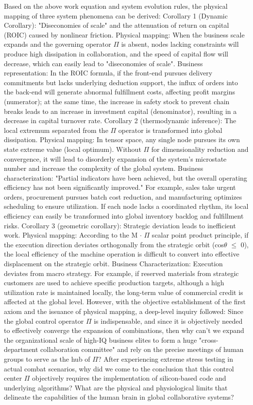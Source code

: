 \documentclass[11pt,a4paper]{article}
\begin{document}
Based on the above work equation and system evolution rules, the physical mapping of three system phenomena can be derived: Corollary 1 (Dynamic Corollary): "Diseconomies of scale" and the attenuation of return on capital (ROIC) caused by nonlinear friction. Physical mapping: When the business scale expands and the governing operator $\Pi$ is absent, nodes lacking constraints will produce high dissipation in collaboration, and the speed of capital flow will decrease, which can easily lead to "diseconomies of scale". Business representation: In the ROIC formula, if the front-end pursues delivery commitments but lacks underlying deduction support, the influx of orders into the back-end will generate abnormal fulfillment costs, affecting profit margins (numerator); at the same time, the increase in safety stock to prevent chain breaks leads to an increase in investment capital (denominator), resulting in a decrease in capital turnover rate. Corollary 2 (thermodynamic inference): The local extremum separated from the $\Pi$ operator is transformed into global dissipation. Physical mapping: In tensor space, any single node pursues its own state extreme value (local optimum). Without $\Pi$ for dimensionality reduction and convergence, it will lead to disorderly expansion of the system's microstate number and increase the complexity of the global system. Business characterization: "Partial indicators have been achieved, but the overall operating efficiency has not been significantly improved." For example, sales take urgent orders, procurement pursues batch cost reduction, and manufacturing optimizes scheduling to ensure utilization. If each node lacks a coordinated rhythm, its local efficiency can easily be transformed into global inventory backlog and fulfillment risks. Corollary 3 (geometric corollary): Strategic deviation leads to inefficient work. Physical mapping: According to the M $\cdot$ $\Pi$ scalar point product principle, if the execution direction deviates orthogonally from the strategic orbit (cos$\theta$ $\le$ 0), the local efficiency of the machine operation is difficult to convert into effective displacement on the strategic orbit. Business Characterization: Execution deviates from macro strategy. For example, if reserved materials from strategic customers are used to achieve specific production targets, although a high utilization rate is maintained locally, the long-term value of commercial credit is affected at the global level. However, with the objective establishment of the first axiom and the issuance of physical mapping, a deep-level inquiry followed: Since the global control operator $\Pi$ is indispensable, and since it is objectively needed to effectively converge the expansion of combinations, then why can't we expand the organizational scale of high-IQ business elites to form a huge "cross-department collaboration committee" and rely on the precise meetings of human groups to serve as the hub of $\Pi$? After experiencing extreme stress testing in actual combat scenarios, why did we come to the conclusion that this control center $\Pi$ objectively requires the implementation of silicon-based code and underlying algorithms? What are the physical and physiological limits that delineate the capabilities of the human brain in global collaborative systems? 
\end{document}
